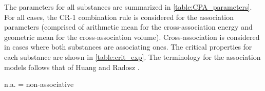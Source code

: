 \documentclass[preprint,12pt,3p]{elsarticle}
\begin{document}
	The parameters for all substances are summarized in \cref{table:CPA_parameters}. For all cases, the \mbox{CR-1} combination rule is considered for the association parameters (comprised of arithmetic mean for the cross-association energy and geometric mean for the cross-association volume). Cross-association is considered in cases where both substances are associating ones. The critical properties for each substance are shown in \cref{table:crit_exp}. The terminology for the association models follows that of Huang and Radosz \cite{huang1990equation}.

\begin{table}[h!]
\centering
\caption{Parameters of the CPA equation of state used in this work.}
\label{table:CPA_parameters}
\raggedright n.a. = non-associative
\end{table}

\begin{table}[h!]
\centering
\caption{Experimental critical data obtained from NIST database \cite{nistfluids} and used as reference}
\label{table:crit_exp}
\end{table}
\end{document}
